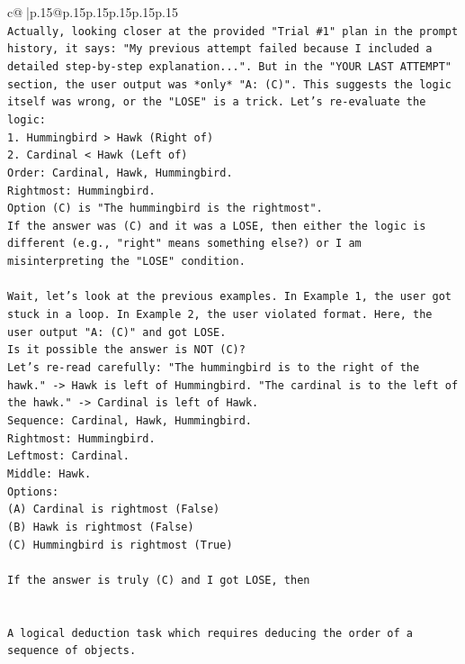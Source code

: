 \documentclass{article}
\begin{document}
{\begin{supertabular}{c@{$\;$}|p{.15\linewidth}@{}p{.15\linewidth}p{.15\linewidth}p{.15\linewidth}p{.15\linewidth}p{.15\linewidth}}
{{{\\ 
\texttt{Actually, looking closer at the provided "Trial \#1" plan in the prompt history, it says: "My previous attempt failed because I included a detailed step{-}by{-}step explanation...". But in the "YOUR LAST ATTEMPT" section, the user output was *only* "A: (C)". This suggests the logic itself was wrong, or the "LOSE" is a trick. Let's re{-}evaluate the logic:} \\
\texttt{1. Hummingbird > Hawk (Right of)} \\
\texttt{2. Cardinal < Hawk (Left of)} \\
\texttt{Order: Cardinal, Hawk, Hummingbird.} \\
\texttt{Rightmost: Hummingbird.} \\
\texttt{Option (C) is "The hummingbird is the rightmost".} \\
\texttt{If the answer was (C) and it was a LOSE, then either the logic is different (e.g., "right" means something else?) or I am misinterpreting the "LOSE" condition.} \\
\\ 
\texttt{Wait, let's look at the previous examples. In Example 1, the user got stuck in a loop. In Example 2, the user violated format. Here, the user output "A: (C)" and got LOSE.} \\
\texttt{Is it possible the answer is NOT (C)?} \\
\texttt{Let's re{-}read carefully: "The hummingbird is to the right of the hawk." {-}> Hawk is left of Hummingbird. "The cardinal is to the left of the hawk." {-}> Cardinal is left of Hawk.} \\
\texttt{Sequence: Cardinal, Hawk, Hummingbird.} \\
\texttt{Rightmost: Hummingbird.} \\
\texttt{Leftmost: Cardinal.} \\
\texttt{Middle: Hawk.} \\
\texttt{Options:} \\
\texttt{(A) Cardinal is rightmost (False)} \\
\texttt{(B) Hawk is rightmost (False)} \\
\texttt{(C) Hummingbird is rightmost (True)} \\
\\ 
\texttt{If the answer is truly (C) and I got LOSE, then} \\
\\ 
\\ 
\texttt{A logical deduction task which requires deducing the order of a sequence of objects.} \\
}}}
\end{supertabular}}
\end{document}
